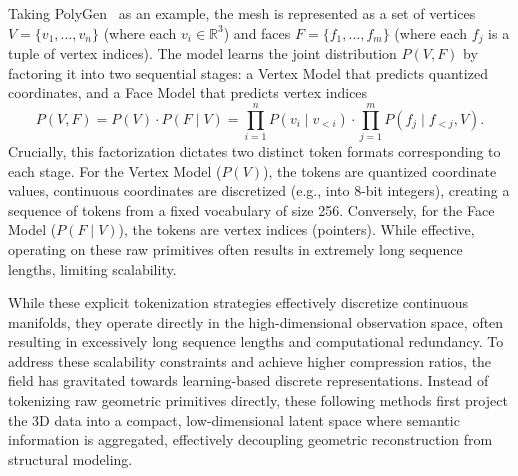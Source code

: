 \documentclass[../../book-main.tex]{subfiles}
\begin{document}
\begin{itemize}
    Taking PolyGen~\cite{nash2020polygen} as an example, the mesh is
    represented as a set of
    vertices $V = \{v_1, \dots, v_n\}$ (where each $v_i \in
    \mathbb{R}^3$) and faces
    $F = \{f_1, \dots, f_m\}$ (where each $f_j$ is a tuple of vertex indices).
    The model learns the joint distribution $P(V, F)$ by factoring it
    into two sequential stages:
    a Vertex Model that predicts quantized coordinates, and a Face
    Model that predicts vertex indices
    \begin{equation}
        P(V, F) = P(V) \cdot P(F \mid V) = \prod_{i=1}^{n} P(v_i \mid
        v_{<i}) \cdot \prod_{j=1}^{m} P(f_j \mid f_{<j}, V).
    \end{equation}
    Crucially, this factorization dictates two distinct token formats
    corresponding to each stage.
    For the Vertex Model ($P(V)$), the tokens are quantized coordinate values,
    continuous coordinates are discretized (e.g., into 8-bit integers),
    creating a sequence of tokens from a fixed vocabulary of size 256.
    Conversely, for the Face Model ($P(F \mid V)$), the tokens are
    vertex indices (pointers).
    While effective, operating on these raw primitives often results
    in extremely long sequence lengths, limiting scalability.


\end{itemize}

While these explicit tokenization strategies effectively discretize
continuous manifolds, they operate directly in the high-dimensional
observation space, often resulting in excessively long sequence lengths
and computational redundancy. To address these scalability constraints
and achieve higher compression ratios, the field has gravitated towards
learning-based discrete representations. Instead of tokenizing raw
geometric primitives directly, these following methods first project the 3D data
into a compact, low-dimensional latent space where semantic information
is aggregated, effectively decoupling geometric reconstruction from
structural modeling.
\end{document}
